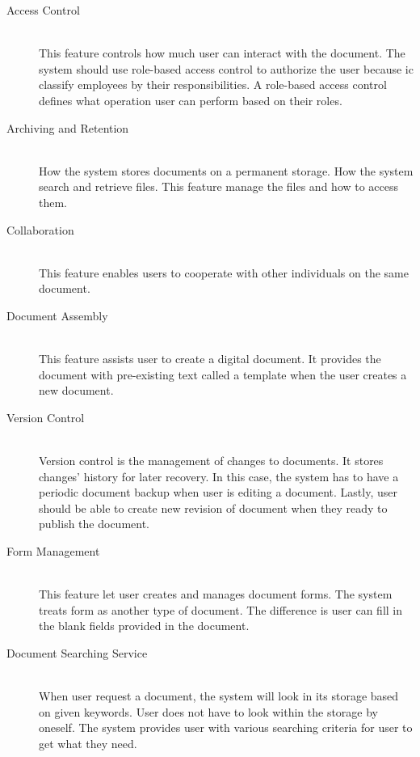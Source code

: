 \begin{description}
\item[Access Control] \hfill \\
This feature controls how much user can interact with the document.
The system should use role-based access control to authorize the user because \gls{ic} classify employees by their responsibilities.
A role-based access control defines what operation user can perform based on their roles.

\item[Archiving and Retention] \hfill \\
How the system stores documents on a permanent storage.
How the system search and retrieve files.
This feature manage the files and how to access them.

\item[Collaboration] \hfill \\
This feature enables users to cooperate with other individuals on the same document. 

\item[Document Assembly] \hfill \\
This feature assists user to create a digital document.
It provides the document with pre-existing text called a template when the user creates a new document.

\item[Version Control] \hfill \\
Version control is the management of changes to documents.
It stores changes' history for later recovery.
In this case, the system has to have a periodic document backup when user is editing a document.
Lastly, user should be able to create new revision of document when they ready to publish the document.

\item[Form Management] \hfill \\
This feature let user creates and manages document forms.
The system treats form as another type of document.
The difference is user can fill in the blank fields provided in the document.

\item[Document Searching Service] \hfill \\
When user request a document, the system will look in its storage based on given keywords.
User does not have to look within the storage by oneself.
The system provides user with various searching criteria for user to get what they need.
\end{description}

